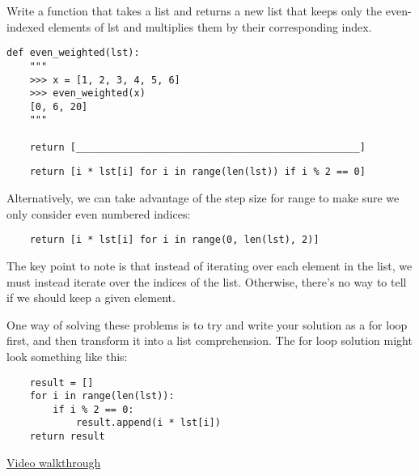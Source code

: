 \question
Write a function that takes a list and returns a new list that keeps only
the even-indexed elements of lst and multiplies them by their
corresponding index.

\begin{lstlisting}
def even_weighted(lst):
    """
    >>> x = [1, 2, 3, 4, 5, 6]
    >>> even_weighted(x)
    [0, 6, 20]
    """

    return [_________________________________________________]
\end{lstlisting}
\begin{solution}[0cm]
\begin{lstlisting}
    return [i * lst[i] for i in range(len(lst)) if i % 2 == 0]
\end{lstlisting}

Alternatively, we can take advantage of the step size for range to make sure we
only consider even numbered indices:

\begin{lstlisting}
    return [i * lst[i] for i in range(0, len(lst), 2)]
\end{lstlisting}

The key point to note is that instead of iterating over each element in the
list, we must instead iterate over the indices of the list. Otherwise, there's
no way to tell if we should keep a given element.

One way of solving these problems is to try and write your solution as a for loop first, and then transform it into a list comprehension. The for loop solution might look something like this:
\begin{lstlisting}
    result = []
    for i in range(len(lst)):
        if i % 2 == 0:
            result.append(i * lst[i])
    return result
\end{lstlisting}
\href{https://www.youtube.com/watch?v=Am6m8YgAnYY&list=PLx38hZJ5RLZdJgRCgpaTbmRXKAHOUmomO&index=4}{Video walkthrough}
\end{solution}
